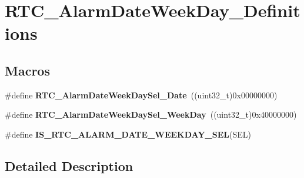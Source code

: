 \hypertarget{group___r_t_c___alarm_date_week_day___definitions}{\section{R\-T\-C\-\_\-\-Alarm\-Date\-Week\-Day\-\_\-\-Definitions}
\label{group___r_t_c___alarm_date_week_day___definitions}
}
\subsection*{Macros}
\begin{DoxyCompactItemize}
\item 
\hypertarget{group___r_t_c___alarm_date_week_day___definitions_ga45ef2c9d40689e0f89bea8c92b6c9a60}{\#define {\bfseries R\-T\-C\-\_\-\-Alarm\-Date\-Week\-Day\-Sel\-\_\-\-Date}~((uint32\-\_\-t)0x00000000)}\label{group___r_t_c___alarm_date_week_day___definitions_ga45ef2c9d40689e0f89bea8c92b6c9a60}

\item 
\hypertarget{group___r_t_c___alarm_date_week_day___definitions_ga1e4d253a3bc6210e6b6af62a1d0fc4d8}{\#define {\bfseries R\-T\-C\-\_\-\-Alarm\-Date\-Week\-Day\-Sel\-\_\-\-Week\-Day}~((uint32\-\_\-t)0x40000000)}\label{group___r_t_c___alarm_date_week_day___definitions_ga1e4d253a3bc6210e6b6af62a1d0fc4d8}

\item 
\#define {\bfseries I\-S\-\_\-\-R\-T\-C\-\_\-\-A\-L\-A\-R\-M\-\_\-\-D\-A\-T\-E\-\_\-\-W\-E\-E\-K\-D\-A\-Y\-\_\-\-S\-E\-L}(S\-E\-L)
\end{DoxyCompactItemize}


\subsection{Detailed Description}


